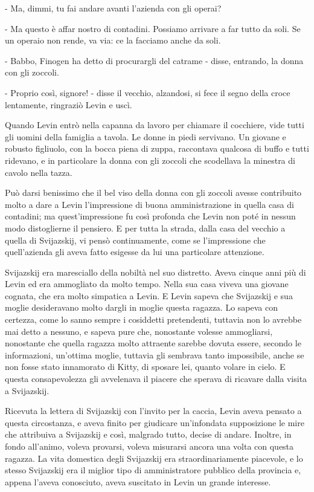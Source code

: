 - Ma, dimmi, tu fai andare avanti l'azienda con gli operai? 

- Ma questo è affar nostro di contadini. Possiamo arrivare a far tutto da soli. Se un operaio non rende, va via: ce la facciamo anche da soli. 

- Babbo, Finogen ha detto di procurargli del catrame - disse, entrando, la donna con gli zoccoli. 

- Proprio così, signore! - disse il vecchio, alzandosi, si fece il segno della croce lentamente, ringraziò Levin e uscì. 

Quando Levin entrò nella capanna da lavoro per chiamare il cocchiere, vide tutti gli uomini della famiglia a tavola. Le donne in piedi servivano. Un giovane e robusto figliuolo, con la bocca piena di zuppa, raccontava qualcosa di buffo e tutti ridevano, e in particolare la donna con gli zoccoli che scodellava la minestra di cavolo nella tazza. 

Può darsi benissimo che il bel viso della donna con gli zoccoli avesse contribuito molto a dare a Levin l'impressione di buona amministrazione in quella casa di contadini; ma quest'impressione fu così profonda che Levin non poté in nessun modo distoglierne il pensiero. E per tutta la strada, dalla casa del vecchio a quella di Svijazskij, vi pensò continuamente, come se l'impressione che quell'azienda gli aveva fatto esigesse da lui una particolare attenzione. 

\label{xxvi-2} 

Svijazskij era maresciallo della nobiltà nel suo distretto. Aveva cinque anni più di Levin ed era ammogliato da molto tempo. Nella sua casa viveva una giovane cognata, che era molto simpatica a Levin. E Levin sapeva che Svijazskij e sua moglie desideravano molto dargli in moglie questa ragazza. Lo sapeva con certezza, come lo sanno sempre i cosiddetti pretendenti, tuttavia non lo avrebbe mai detto a nessuno, e sapeva pure che, nonostante volesse ammogliarsi, nonostante che quella ragazza molto attraente sarebbe dovuta essere, secondo le informazioni, un'ottima moglie, tuttavia gli sembrava tanto impossibile, anche se non fosse stato innamorato di Kitty, di sposare lei, quanto volare in cielo. E questa consapevolezza gli avvelenava il piacere che sperava di ricavare dalla visita a Svijazskij. 

Ricevuta la lettera di Svijazskij con l'invito per la caccia, Levin aveva pensato a questa circostanza, e aveva finito per giudicare un'infondata supposizione le mire che attribuiva a Svijazskij e così, malgrado tutto, decise di andare. Inoltre, in fondo all'animo, voleva provarsi, voleva misurarsi ancora una volta con questa ragazza. La vita domestica degli Svijazskij era straordinariamente piacevole, e lo stesso Svijazskij era il miglior tipo di amministratore pubblico della provincia e, appena l'aveva conosciuto, aveva suscitato in Levin un grande interesse. 

